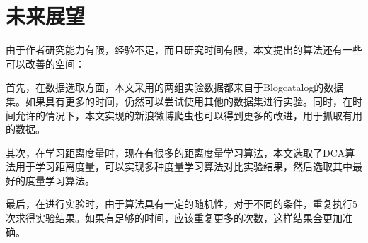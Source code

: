 \section{未来展望}

由于作者研究能力有限，经验不足，而且研究时间有限，本文提出的算法还有一些可以改善的空间：

首先，在数据选取方面，本文采用的两组实验数据都来自于Blogcatalog的数据集。如果具有更多的时间，仍然可以尝试使用其他的数据集进行实验。同时，在时间允许的情况下，本文实现的新浪微博爬虫也可以得到更多的改进，用于抓取有用的数据。

其次，在学习距离度量时，现在有很多的距离度量学习算法，本文选取了DCA算法用于学习距离度量，可以实现多种度量学习算法对比实验结果，然后选取其中最好的度量学习算法。

最后，在进行实验时，由于算法具有一定的随机性，对于不同的条件，重复执行5次求得实验结果。如果有足够的时间，应该重复更多的次数，这样结果会更加准确。
